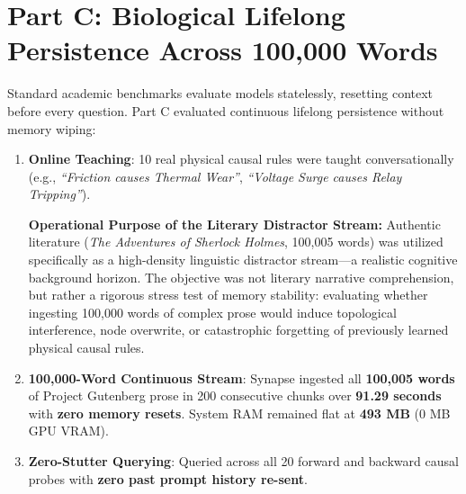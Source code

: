 \documentclass[11pt,a4paper]{article}
\begin{document}
\section{Part C: Biological Lifelong Persistence Across 100,000 Words}
Standard academic benchmarks evaluate models statelessly, resetting context before every question. Part C evaluated continuous lifelong persistence without memory wiping:
\begin{enumerate}[leftmargin=1.5em, itemsep=1pt, topsep=1pt]
  \item \textbf{Online Teaching}: 10 real physical causal rules were taught conversationally (e.g., \textit{``Friction causes Thermal Wear''}, \textit{``Voltage Surge causes Relay Tripping''}).
  \begin{calloutbox}
\textbf{Operational Purpose of the Literary Distractor Stream:} Authentic literature (\textit{The Adventures of Sherlock Holmes}, 100,005 words) was utilized specifically as a high-density linguistic distractor stream---a realistic cognitive background horizon. The objective was not literary narrative comprehension, but rather a rigorous stress test of memory stability: evaluating whether ingesting 100,000 words of complex prose would induce topological interference, node overwrite, or catastrophic forgetting of previously learned physical causal rules.
\end{calloutbox}

\item \textbf{100,000-Word Continuous Stream}: Synapse ingested all \textbf{100,005 words} of Project Gutenberg prose in 200 consecutive chunks over \textbf{91.29 seconds} with \textbf{zero memory resets}. System RAM remained flat at \textbf{493 MB} (0 MB GPU VRAM).
  \item \textbf{Zero-Stutter Querying}: Queried across all 20 forward and backward causal probes with \textbf{zero past prompt history re-sent}.
\end{enumerate}
\end{document}
